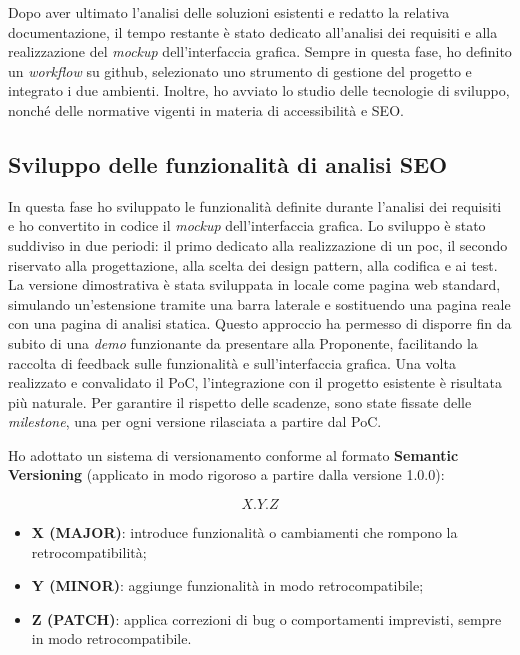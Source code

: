 \vspace{5pt}
\par\noindent Dopo aver ultimato l’analisi delle soluzioni esistenti e redatto la relativa documentazione, il tempo restante è stato dedicato all’analisi dei requisiti e alla realizzazione del \textit{mockup} dell’interfaccia grafica. Sempre in questa fase, ho definito un \textit{workflow} su \gls{github}, selezionato uno strumento di gestione del progetto e integrato i due ambienti. Inoltre, ho avviato lo studio delle tecnologie di sviluppo, nonché delle normative vigenti in materia di accessibilità e SEO.

\subsection{Sviluppo delle funzionalità di analisi SEO}

\par In questa fase ho sviluppato le funzionalità definite durante l’analisi dei requisiti e ho convertito in codice il \textit{mockup} dell’interfaccia grafica. Lo sviluppo è stato suddiviso in due periodi: il primo dedicato alla realizzazione di un \gls{poc}, il secondo riservato alla progettazione, alla scelta dei design pattern, alla codifica e ai test. La versione dimostrativa è stata sviluppata in locale come pagina web standard, simulando un’estensione tramite una barra laterale e sostituendo una pagina reale con una pagina di analisi statica. Questo approccio ha permesso di disporre fin da subito di una \textit{demo} funzionante da presentare alla Proponente, facilitando la raccolta di feedback sulle funzionalità e sull’interfaccia grafica. Una volta realizzato e convalidato il PoC, l’integrazione con il progetto esistente è risultata più naturale. Per garantire il rispetto delle scadenze, sono state fissate delle \textit{milestone}, una per ogni versione rilasciata a partire dal PoC.

\vspace{10pt}
\par\noindent Ho adottato un sistema di versionamento conforme al formato \textbf{Semantic Versioning} (applicato in modo rigoroso a partire dalla versione 1.0.0):

\[
X.Y.Z
\]

\begin{itemize}
  \item \textbf{X (MAJOR)}: introduce funzionalità o cambiamenti che rompono  la retrocompatibilità;
  \item \textbf{Y (MINOR)}: aggiunge funzionalità in modo retrocompatibile;
  \item \textbf{Z (PATCH)}: applica correzioni di bug o comportamenti imprevisti, sempre in modo retrocompatibile.
\end{itemize}

